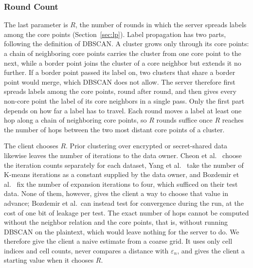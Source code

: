 \subsubsection{Round Count}
\label{sec:rounds}

The last parameter is $R$, the number of rounds in which the server
spreads labels among the core points (Section~\ref{sec:lp}). Label
propagation has two parts, following the definition of DBSCAN. A cluster
grows only through its core points: a chain of neighboring core points
carries the cluster from one core point to the next, while a border
point joins the cluster of a core neighbor but extends it no further. If
a border point passed its label on, two clusters that share a border
point would merge, which DBSCAN does not allow. The server therefore
first spreads labels among the core points, round after round, and then
gives every non-core point the label of its core neighbors in a single
pass. Only the first part depends on how far a label has to travel. Each
round moves a label at least one hop along a chain of neighboring core
points, so $R$ rounds suffice once $R$ reaches the number of hops between
the two most distant core points of a cluster.

The client chooses $R$. Prior clustering over encrypted or secret-shared
data likewise leaves the number of iterations to the data owner. Cheon et
al.~\cite{cheon2019towards} choose the iteration counts separately for
each dataset, Yang et al.~\cite{yang2024optimized} take the number of
K-means iterations as a constant supplied by the data owner, and Bozdemir
et al.~\cite{bozdemir2021privacy} fix the number of expansion iterations
to four, which sufficed on their test data. None of them, however, gives
the client a way to choose that value in advance; Bozdemir et al.\ can
instead test for convergence during the run, at the cost of one bit of
leakage per test. The exact number of hops cannot be computed without the
neighbor relation and the core points, that is, without running DBSCAN on
the plaintext, which would leave nothing for the server to do. We
therefore give the client a naive estimate from a coarse grid.
It uses only cell indices and cell counts, never compares a distance with
$\varepsilon_n$, and gives the client a starting value when it chooses
$R$.

